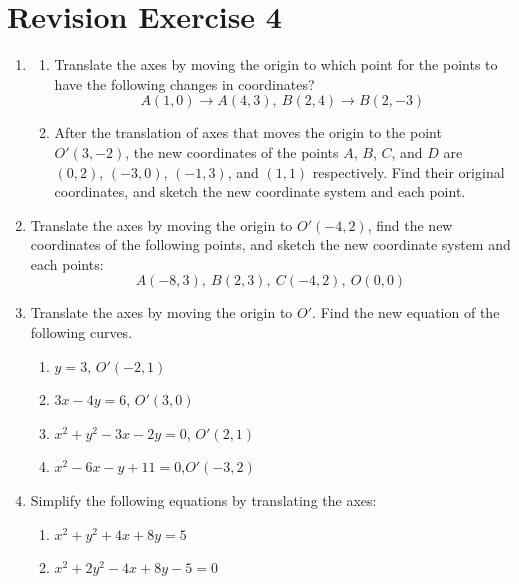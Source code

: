 \documentclass{report}
\begin{document}
\section*{Revision Exercise 4}
\begin{enumerate}[leftmargin=*]
    \item \begin{enumerate}
              \item Translate the axes by moving the origin to which point for the points to have
                    the following changes in coordinates?
                    \[A(1, 0) \to A(4, 3),\ B(2, 4) \to B(2, -3)\]
              \item After the translation of axes that moves the origin to the point $O'(3, -2)$,
                    the new coordinates of the points $A$, $B$, $C$, and $D$ are $(0, 2)$, $(-3,
                        0)$, $(-1, 3)$, and $(1, 1)$ respectively. Find their original coordinates, and
                    sketch the new coordinate system and each point.
          \end{enumerate}
    \item Translate the axes by moving the origin to $O'(-4, 2)$, find the new
          coordinates of the following points, and sketch the new coordinate system and
          each points:
          \[A(-8, 3),\ B(2, 3),\ C(-4, 2),\ O(0, 0)\]
    \item Translate the axes by moving the origin to $O'$. Find the new equation of the
          following curves.
          \begin{enumerate}
              \item $y = 3$, \qquad\qquad\qquad\qquad\hspace{0.5em}$O'(-2, 1)$
              \item $3x - 4y = 6$, \qquad\qquad\quad\hspace{0.7em}$O'(3, 0)$
              \item $x^2 + y^2 - 3x - 2y = 0$,\hspace{1.3em} $O'(2, 1)$
              \item $x^2 - 6x - y + 11 = 0$,\qquad $O'(-3, 2)$
          \end{enumerate}
    \item Simplify the following equations by translating the axes:
          \begin{enumerate}
              \item $x^2 + y^2 + 4x + 8y = 5$
              \item $x^2 + 2y^2 - 4x + 8y - 5 = 0$

\end{enumerate}
\end{enumerate}
\end{document}

